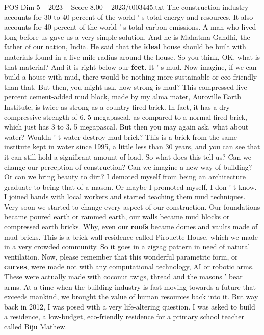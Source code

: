 \begin{textsample}{POS Dim 5 – 2023 – Score 8.00 – 2023/t003445.txt}  \label{ex:f5_pos_071}
The construction industry accounts for 30 to 40 percent of the world ' s total energy and resources.
It also accounts for 40 percent of the world ' s total carbon emissions.
A man who lived long before us gave us a very simple solution.
And he is Mahatma Gandhi, the father of our nation, India.
He said that the \textbf{ideal} house should be built with materials found in a five-mile radius around the house.
So you think, OK, what is that material?
And it is right below our \textbf{feet}.
It ' s mud.
Now imagine, if we can build a house with mud, there would be nothing more sustainable or eco-friendly than that.
But then, you might ask, how strong is mud?
This compressed five percent cement-added mud block, made by my alma mater, Auroville Earth Institute, is twice as strong as a country fired brick.
In fact, it has a dry compressive strength of 6. 5 megapascal, as compared to a normal fired-brick, which just has 3 to 3. 5 megapascal.
But then you may again ask, what about water?
Wouldn ' t water destroy mud brick?
This is a brick from the same institute kept in water since 1995, a little less than 30 years, and you can see that it can still hold a significant amount of load.
So what does this tell us?
Can we change our perception of construction?
Can we imagine a new way of building?
Or can we bring beauty to dirt?
I demoted myself from being an architecture graduate to being that of a mason.
Or maybe I promoted myself, I don ' t know.
I joined hands with local workers and started teaching them mud techniques.
Very soon we started to change every aspect of our construction.
Our foundations became poured earth or rammed earth, our walls became mud blocks or compressed earth bricks.
Why, even our \textbf{roofs} became domes and vaults made of mud bricks.
This is a brick wall residence called Pirouette House, which we made in a very crowded community.
So it goes in a zigzag pattern in need of natural ventilation.
Now, please remember that this wonderful parametric form, or \textbf{curves}, were made not with any computational technology, AI or robotic arms.
These were actually made with coconut twigs, thread and the masons ' bear arms.
At a time when the building industry is fast moving towards a future that exceeds mankind, we brought the value of human resources back into it.
But way back in 2012, I was posed with a very life-altering question.
I was asked to build a residence, a low-budget, eco-friendly residence for a primary school teacher called Biju Mathew.

\end{textsample}
